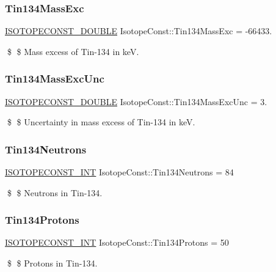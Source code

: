 \subsubsection{\texorpdfstring{Tin134\+Mass\+Exc}{Tin134MassExc}}
{\footnotesize\ttfamily \mbox{\hyperlink{group___isotope_const-_macros_ga8f45a7272ce02c0b4c65c44636ed719a}{I\+S\+O\+T\+O\+P\+E\+C\+O\+N\+S\+T\+\_\+\+D\+O\+U\+B\+LE}} Isotope\+Const\+::\+Tin134\+Mass\+Exc = -\/66433.}

\$ \$ Mass excess of Tin-\/134 in keV. \mbox{\label{group___isotope_const-_tin-_sn134_gab8e0af5db127345ec2230fe299ea7836}} 
\subsubsection{\texorpdfstring{Tin134\+Mass\+Exc\+Unc}{Tin134MassExcUnc}}
{\footnotesize\ttfamily \mbox{\hyperlink{group___isotope_const-_macros_ga8f45a7272ce02c0b4c65c44636ed719a}{I\+S\+O\+T\+O\+P\+E\+C\+O\+N\+S\+T\+\_\+\+D\+O\+U\+B\+LE}} Isotope\+Const\+::\+Tin134\+Mass\+Exc\+Unc = 3.}

\$ \$ Uncertainty in mass excess of Tin-\/134 in keV. \mbox{\label{group___isotope_const-_tin-_sn134_ga6bece9e87c4f8f389192914790234eaf}} 
\subsubsection{\texorpdfstring{Tin134\+Neutrons}{Tin134Neutrons}}
{\footnotesize\ttfamily \mbox{\hyperlink{group___isotope_const-_macros_ga5f18360b3e99483a35c32d789e62621c}{I\+S\+O\+T\+O\+P\+E\+C\+O\+N\+S\+T\+\_\+\+I\+NT}} Isotope\+Const\+::\+Tin134\+Neutrons = 84}

\$ \$ Neutrons in Tin-\/134. \mbox{\label{group___isotope_const-_tin-_sn134_ga63b517188fe1f3c2d070d6f85168535e}} 
\subsubsection{\texorpdfstring{Tin134\+Protons}{Tin134Protons}}
{\footnotesize\ttfamily \mbox{\hyperlink{group___isotope_const-_macros_ga5f18360b3e99483a35c32d789e62621c}{I\+S\+O\+T\+O\+P\+E\+C\+O\+N\+S\+T\+\_\+\+I\+NT}} Isotope\+Const\+::\+Tin134\+Protons = 50}

\$ \$ Protons in Tin-\/134. 